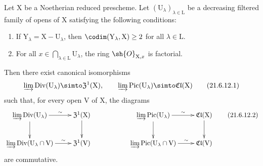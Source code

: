 \begin{proposition}[21.6.12]
\label{IV.21.6.12}
Let $\mathrm{X}$ be a Noetherian reduced prescheme.
Let $(\mathrm{U}_\lambda)_{\lambda\in\mathrm{L}}$ be a decreasing filtered family of opens of $\mathrm{X}$ satisfying the following conditions:
\begin{enumerate}
  \item[\rm 1\textsuperscript{o}] If $\mathrm{Y}_\lambda=\mathrm{X}-\mathrm{U}_\lambda$, then $\codim(\mathrm{Y}_\lambda,\mathrm{X})\geq 2$ for all $\lambda\in\mathrm{L}$.
  \item[\rm 2\textsuperscript{o}] For all $x\in\bigcap_{\lambda\in\mathrm{L}}\mathrm{U}_\lambda$, the ring $\sh{O}_{\mathrm{X},x}$ is factorial.
\end{enumerate}
Then there exist canonical isomorphisms
\[
\label{IV.21.6.12.1}
  \varinjlim\operatorname{Div}(\mathrm{U}_\lambda)\simto\mathfrak{Z}^1(\mathrm{X}),\qquad
  \varinjlim\operatorname{Pic}(\mathrm{U}_\lambda)\simto\mathfrak{Cl}(\mathrm{X})
  \tag{21.6.12.1}
\]
such that, for every open $\mathrm{V}$ of $\mathrm{X}$, the diagrams
\[
\label{IV.21.6.12.2}
  \xymatrix{
    \varinjlim\operatorname{Div}(\mathrm{U}_\lambda) \ar[r]^-\sim \ar[d] & \mathfrak{Z}^1(\mathrm{X}) \ar[d] & & \varinjlim\operatorname{Pic}(\mathrm{U}_\lambda) \ar[r]^-\sim \ar[d] & \mathfrak{Cl}(\mathrm{X}) \ar[d]\\
    \varinjlim\operatorname{Div}(\mathrm{U}_\lambda\cap\mathrm{V}) \ar[r]^-\sim & \mathfrak{Z}^1(\mathrm{V}) & & \varinjlim\operatorname{Pic}(\mathrm{U}_\lambda\cap\mathrm{V}) \ar[r]^-\sim & \mathfrak{Cl}(\mathrm{V})
  }
  \tag{21.6.12.2}
\]
are commutative.
\end{proposition}

